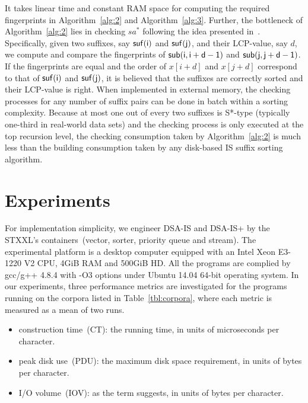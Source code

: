 \documentclass[10pt,journal,compsoc]{IEEEtran}
\begin{document}
It takes linear time and constant RAM space for computing the required fingerprints in Algorithm~\ref{alg:2} and Algorithm~\ref{alg:3}. Further, the bottleneck of Algorithm~\ref{alg:2} lies in checking $sa^*$ following the idea presented in~\cite{wu2017}. Specifically, given two suffixes, say $\sf suf(i)$ and $\sf suf(j)$, and their LCP-value, say $d$, we compute and compare the fingerprints of $\sf sub(i, i + d - 1)$ and $\sf sub(j, j + d - 1)$. If the fingerprints are equal and the order of $x[i + d]$ and $x[j + d]$ correspond to that of $\sf suf(i)$ and $\sf suf(j)$, it is believed that the suffixes are correctly sorted and their LCP-value is right. When implemented in external memory, the checking processes for any number of suffix pairs can be done in batch within a sorting complexity. Because at most one out of every two suffixes is S*-type (typically one-third in real-world data sets) and the checking process is only executed at the top recursion level, the checking consumption taken by Algorithm~\ref{alg:2} is much less than the building consumption taken by any disk-based IS suffix sorting algorithm.
 
\section{Experiments} \label{sec:experiments}

For implementation simplicity, we engineer DSA-IS and DSA-IS+ by the STXXL's containers~(vector, sorter, priority queue and stream). The experimental platform is a desktop computer equipped with an Intel Xeon E3-1220 V2 CPU, 4GiB RAM and 500GiB HD. All the programs are complied by gcc/g++ 4.8.4 with -O3 options under Ubuntu 14.04 64-bit operating system. In our experiments, three performance metrics are investigated for the programs running on the corpora listed in Table~\ref{tbl:corpora}, where each metric is measured as a mean of two runs.

\begin{itemize}
	\item construction time~(CT): the running time, in units of microseconds per character.
	\item peak disk use~(PDU): the maximum disk space requirement, in units of bytes per character.
	\item I/O volume~(IOV): as the term suggests, in units of bytes per character.
\end{itemize}
\end{document}
